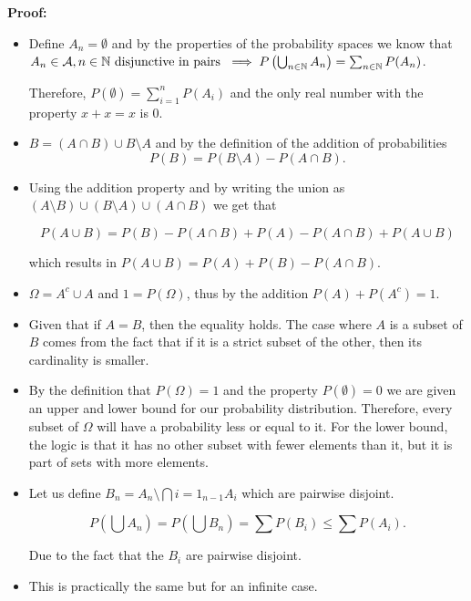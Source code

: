 \textbf{Proof:}

\begin{itemize}

    \item Define \(A_n = \emptyset\) and by the properties of the probability spaces we know that  
    \(A_n \in \mathcal{A}, n \in \mathbb{N} \text{ disjunctive in pairs } \implies P\left(\bigcup_{n \in \mathbb{N}} A_n\right) = \sum_{n \in \mathbb{N}} P(A_n)\).
    
    Therefore, \(P(\emptyset) = \sum_{i = 1}^{n} P(A_i)\) and the only real number with the property \(x + x = x\) is 0.
    
 
    \item \(B = (A \cap B) \cup B \setminus A\) and by the definition of the addition of probabilities 
    \[
    	P(B) = P(B \setminus A) - P(A \cap B).
    \]
    
    \item Using the addition property and by writing the union as \((A \setminus B) \cup (B \setminus A) \cup (A \cap B)\) we get that 

    \[
	    P(A \cup B) = P(B) - P(A \cap B) + P(A) - P(A \cap B) + P(A \cup B)
    \]

    which results in \( P(A \cup B) = P(A) + P(B) - P(A \cap B) \).
 
    \item \(\Omega = A^c \cup A\) and \(1 = P(\Omega)\), thus by the addition \(P(A) + P(A^c) = 1\).
    
    \item Given that if \(A = B\), then the equality holds. The case where \(A\) is a subset of \(B\) comes 
    from the fact that if it is a strict subset of the other, then its cardinality is smaller.
    
    \item By the definition that \(P(\Omega) = 1\) and the property \(P(\emptyset) = 0\) 
    we are given an upper and lower bound for our probability distribution. Therefore, every subset of \(\Omega\) will 
    have a probability less or equal to it. For the lower bound, the logic is that it has no other subset with fewer elements than it, but 
    it is part of sets with more elements.
    
    \item Let us define \(B_n = A_n \setminus \bigcap{i = 1}_{n - 1} A_i\) which are pairwise disjoint. 
    
    \[
	    P\left(\bigcup A_n\right) = P\left(\bigcup B_n\right) = \sum P\left(B_i\right) \le \sum P\left(A_i\right).
    \]
    
    Due to the fact that the \(B_i\) are pairwise disjoint.

    \item This is practically the same but for an infinite case.  

\end{itemize}

